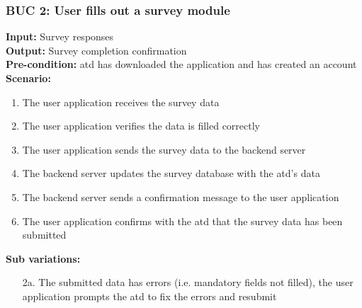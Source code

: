 \documentclass[12pt]{article}
\begin{document}
\subsubsection*{BUC 2: User fills out a survey module}
\textbf{Input:} Survey responses \\
\textbf{Output:} Survey completion confirmation \\
\textbf{Pre-condition:} \Gls{atd} has downloaded the application and has created an account \\
\textbf{Scenario:}
\begin{enumerate}
  \item The user application receives the survey data
  \item The user application verifies the data is filled correctly
  \item The user application sends the survey data to the backend server
  \item The backend server updates the survey database with the \gls{atd}'s data
  \item The backend server sends a confirmation message to the user application
  \item The user application confirms with the \gls{atd} that the survey data has been submitted
\end{enumerate}
\textbf{Sub variations:}
\begin{itemize}
  \item [2a.] The submitted data has errors (i.e. mandatory fields not filled), the user application prompts the \gls{atd} to fix the errors and resubmit
\end{itemize}
\end{document}
